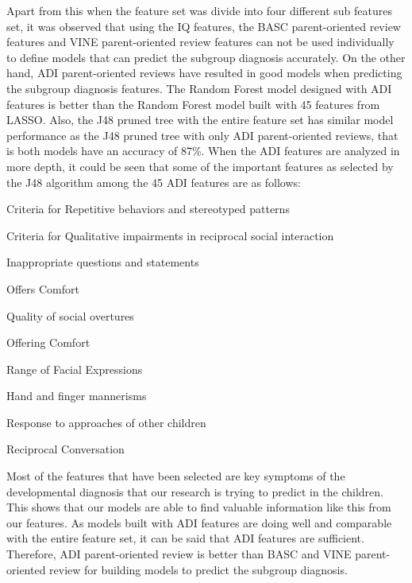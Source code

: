 Apart from this when the feature set was divide into four different sub features set, it was observed that using the IQ features, the BASC parent-oriented review features and VINE parent-oriented review features can not be used individually to define models that can predict the subgroup diagnosis accurately. On the other hand, ADI parent-oriented reviews have resulted in good models when predicting the subgroup diagnosis features. The Random Forest model designed with ADI features is better than the Random Forest model built with 45 features from LASSO. Also, the J48 pruned tree with the entire feature set has similar model performance as the J48 pruned tree with only ADI parent-oriented reviews, that is both models have an accuracy of 87\%. When the ADI features are analyzed in more depth, it could be seen that some of the important features as selected by the J48 algorithm among the 45 ADI features are as follows:
\begin{compactenum}
\item Criteria for Repetitive behaviors and stereotyped patterns
\item Criteria for Qualitative impairments in reciprocal social interaction
\item Inappropriate questions and statements
\item Offers Comfort
\item Quality of social overtures
\item Offering Comfort
\item Range of Facial Expressions 
\item Hand and finger mannerisms
\item Response to approaches of other children
\item Reciprocal Conversation
\end{compactenum}

Most of the features that have been selected are key symptoms of the developmental diagnosis that our research is trying to predict in the children. This shows that our models are able to find valuable information like this from our features. As models built with ADI features are doing well and comparable with the entire feature set, it can be said that ADI features are sufficient. Therefore, ADI parent-oriented review is better than BASC and VINE parent-oriented review for building models to predict the subgroup diagnosis.